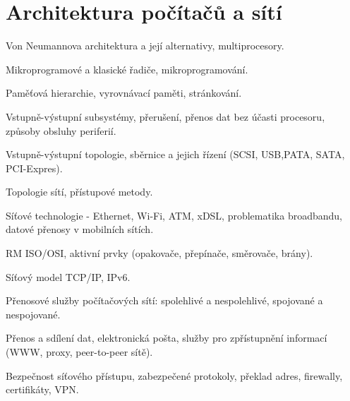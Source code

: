 \newpage
\section{Architektura počítačů a sítí}
\begin{pozadavky}
\begin{pitemize}
\item Von Neumannova architektura a její alternativy, multiprocesory.
\item Mikroprogramové a klasické řadiče, mikroprogramování.
\item Paměťová hierarchie, vyrovnávací paměti, stránkování.
\item Vstupně-výstupní subsystémy, přerušení, přenos dat bez účasti procesoru, způsoby obsluhy periferií.
\item Vstupně-výstupní topologie, sběrnice a jejich řízení (SCSI, USB,PATA, SATA, PCI-Expres).
\item Topologie sítí, přístupové metody.
\item Síťové technologie - Ethernet, Wi-Fi, ATM, xDSL, problematika broadbandu, datové přenosy v mobilních sítích.
\item RM ISO/OSI, aktivní prvky (opakovače, přepínače, směrovače, brány).
\item Síťový model TCP/IP, IPv6.
\item Přenosové služby počítačových sítí: spolehlivé a nespolehlivé, spojované a nespojované.
\item Přenos a sdílení dat, elektronická pošta, služby pro zpřístupnění informací (WWW, proxy, peer-to-peer sítě).
\item Bezpečnost síťového přístupu, zabezpečené protokoly, překlad adres, firewally, certifikáty, VPN.
\end{pitemize}
\end{pozadavky}